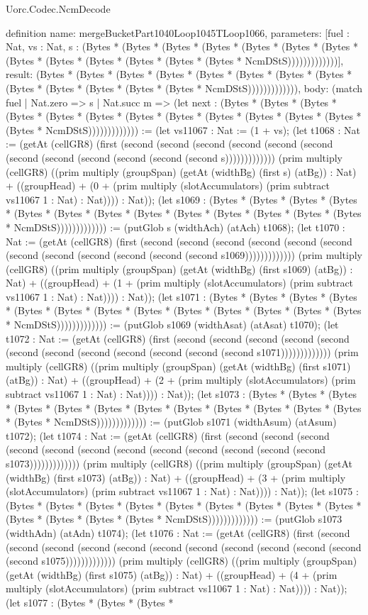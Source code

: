 \begin{lexlean}{Uorc.Codec.NcmDecode}
\begin{semanticmodule}
definition{
  name: mergeBucketPart1040Loop1045TLoop1066,
  parameters: [fuel : Nat, vs : Nat, s : (Bytes * (Bytes * (Bytes * (Bytes * (Bytes * (Bytes * (Bytes * (Bytes * (Bytes * (Bytes * (Bytes * (Bytes * (Bytes * NcmDStS)))))))))))))],
  result: (Bytes * (Bytes * (Bytes * (Bytes * (Bytes * (Bytes * (Bytes * (Bytes * (Bytes * (Bytes * (Bytes * (Bytes * (Bytes * NcmDStS))))))))))))),
  body: (match fuel
    | Nat.zero => s
    | Nat.succ m => (let next : (Bytes * (Bytes * (Bytes * (Bytes * (Bytes * (Bytes * (Bytes * (Bytes * (Bytes * (Bytes * (Bytes * (Bytes * (Bytes * NcmDStS))))))))))))) := (let vs11067 : Nat := (1 + vs); (let t1068 : Nat := (getAt (cellGR8) (first (second (second (second (second (second (second (second (second (second (second (second (second s))))))))))))) (prim multiply (cellGR8) ((prim multiply (groupSpan) (getAt (widthBg) (first s) (atBg)) : Nat) + ((groupHead) + (0 + (prim multiply (slotAccumulators) (prim subtract vs11067 1 : Nat) : Nat)))) : Nat)); (let s1069 : (Bytes * (Bytes * (Bytes * (Bytes * (Bytes * (Bytes * (Bytes * (Bytes * (Bytes * (Bytes * (Bytes * (Bytes * (Bytes * NcmDStS))))))))))))) := (putGlob s (widthAch) (atAch) t1068); (let t1070 : Nat := (getAt (cellGR8) (first (second (second (second (second (second (second (second (second (second (second (second (second s1069))))))))))))) (prim multiply (cellGR8) ((prim multiply (groupSpan) (getAt (widthBg) (first s1069) (atBg)) : Nat) + ((groupHead) + (1 + (prim multiply (slotAccumulators) (prim subtract vs11067 1 : Nat) : Nat)))) : Nat)); (let s1071 : (Bytes * (Bytes * (Bytes * (Bytes * (Bytes * (Bytes * (Bytes * (Bytes * (Bytes * (Bytes * (Bytes * (Bytes * (Bytes * NcmDStS))))))))))))) := (putGlob s1069 (widthAsat) (atAsat) t1070); (let t1072 : Nat := (getAt (cellGR8) (first (second (second (second (second (second (second (second (second (second (second (second (second s1071))))))))))))) (prim multiply (cellGR8) ((prim multiply (groupSpan) (getAt (widthBg) (first s1071) (atBg)) : Nat) + ((groupHead) + (2 + (prim multiply (slotAccumulators) (prim subtract vs11067 1 : Nat) : Nat)))) : Nat)); (let s1073 : (Bytes * (Bytes * (Bytes * (Bytes * (Bytes * (Bytes * (Bytes * (Bytes * (Bytes * (Bytes * (Bytes * (Bytes * (Bytes * NcmDStS))))))))))))) := (putGlob s1071 (widthAsum) (atAsum) t1072); (let t1074 : Nat := (getAt (cellGR8) (first (second (second (second (second (second (second (second (second (second (second (second (second s1073))))))))))))) (prim multiply (cellGR8) ((prim multiply (groupSpan) (getAt (widthBg) (first s1073) (atBg)) : Nat) + ((groupHead) + (3 + (prim multiply (slotAccumulators) (prim subtract vs11067 1 : Nat) : Nat)))) : Nat)); (let s1075 : (Bytes * (Bytes * (Bytes * (Bytes * (Bytes * (Bytes * (Bytes * (Bytes * (Bytes * (Bytes * (Bytes * (Bytes * (Bytes * NcmDStS))))))))))))) := (putGlob s1073 (widthAdn) (atAdn) t1074); (let t1076 : Nat := (getAt (cellGR8) (first (second (second (second (second (second (second (second (second (second (second (second (second s1075))))))))))))) (prim multiply (cellGR8) ((prim multiply (groupSpan) (getAt (widthBg) (first s1075) (atBg)) : Nat) + ((groupHead) + (4 + (prim multiply (slotAccumulators) (prim subtract vs11067 1 : Nat) : Nat)))) : Nat)); (let s1077 : (Bytes * (Bytes * (Bytes * }
\end{semanticmodule}
\end{lexlean}
